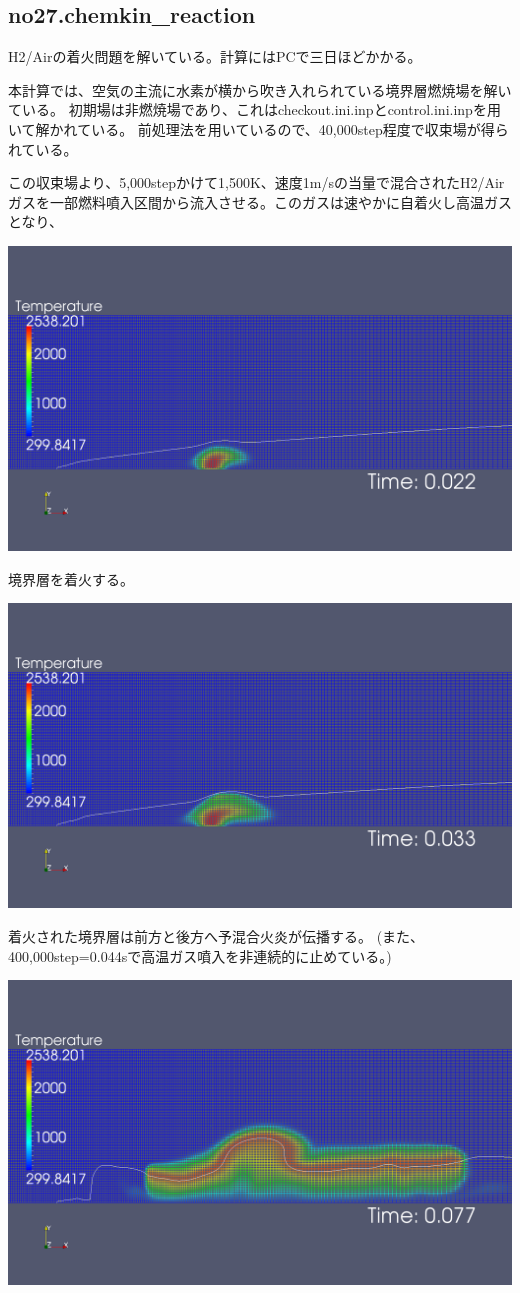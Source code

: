 \documentclass{jsarticle}
\begin{document}
\subsection{no27.chemkin\_reaction}%
H2/Airの着火問題を解いている。計算にはPCで三日ほどかかる。

本計算では、空気の主流に水素が横から吹き入れられている境界層燃焼場を解いている。
初期場は非燃焼場であり、これはcheckout.ini.inpとcontrol.ini.inpを用いて解かれている。
前処理法を用いているので、40,000step程度で収束場が得られている。

この収束場より、5,000stepかけて1,500K、速度1m/sの当量で混合されたH2/Airガスを一部燃料噴入区間から流入させる。このガスは速やかに自着火し高温ガスとなり、
\begin{center}
\includegraphics[width=.65\textwidth,bb=0 0 1440 872]{sample/no27.1.png}
\end{center}
境界層を着火する。
\begin{center}
\includegraphics[width=.65\textwidth,bb=0 0 1440 872]{sample/no27.2.png}
\end{center}
着火された境界層は前方と後方へ予混合火炎が伝播する。
(また、400,000step=0.044sで高温ガス噴入を非連続的に止めている。)
\begin{center}
\includegraphics[width=.65\textwidth,bb=0 0 1440 872]{sample/no27.3.png}
\end{center}
\end{document}
